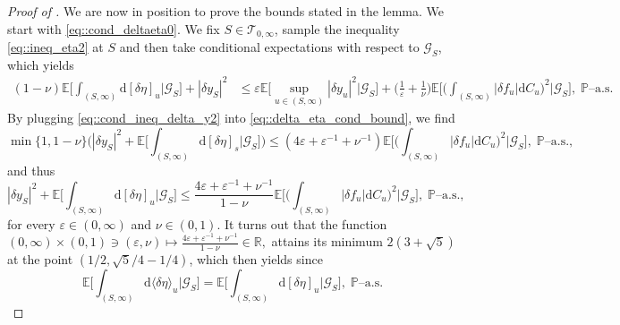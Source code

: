 \documentclass[10pt]{article} %
\newcommand\cG{\mathcal G}
\newcommand\cT{\mathcal T}
\def \E{\mathbb{E}}
\def \P{\mathbb{P}}
\def \R{\mathbb{R}}
\def\d{\mathrm{d}}
\begin{document}
\begin{proof}[Proof of ]
\medskip
We are now in position to prove the bounds stated in the lemma. We start with \eqref{eq::cond_deltaeta0}. We fix $S \in \cT_{0,\infty}$, sample the inequality \eqref{eq::ineq_eta2} at $S$ and then take conditional expectations with respect to $\cG_S$, which yields
\begin{align}\label{eq::delta_eta_cond_bound}
	(1-\nu) \E \bigg[\int_{(S,\infty)} \d [\delta \eta]_u \bigg| \cG_S \bigg] + |\delta y_S|^2 
	&\leq  \varepsilon \E\bigg[ \sup_{u \in (S,\infty)} |\delta y_u|^2 \bigg| \cG_S \bigg] + \bigg(\frac{1}{\varepsilon} + \frac{1}{\nu}\bigg) \E\bigg[ \bigg( \int_{(S,\infty)} |\delta f_u| \d C_u\bigg)^2 \bigg| \cG_S \bigg], \; \text{$\P$--a.s.}
\end{align}
By plugging \eqref{eq::cond_ineq_delta_y2} into \eqref{eq::delta_eta_cond_bound}, we find
\begin{equation*}
	\min\{1,1-\nu\}\bigg(|\delta y_S|^2 + \E \bigg[ \int_{(S,\infty)} \d [\delta \eta]_s \bigg| \cG_S \bigg]\bigg) \leq (4 \varepsilon + {\varepsilon}^{-1} + {\nu}^{-1}) \E\bigg[ \bigg( \int_{(S,\infty)} |\delta f_u| \d C_u\bigg)^2 \bigg| \cG_S \bigg], \; \text{$\P$--a.s.},
\end{equation*}
and thus
\begin{equation*}
	|\delta y_S|^2 + \E \bigg[ \int_{(S,\infty)} \d [\delta \eta]_u \bigg| \cG_S \bigg]\leq \frac{4 \varepsilon + {\varepsilon}^{-1} + {\nu}^{-1}}{1-\nu} \E\bigg[ \bigg( \int_{(S,\infty)} |\delta f_u| \d C_u\bigg)^2 \bigg| \cG_S \bigg], \; \text{$\P$--a.s.},
\end{equation*}
for every $\varepsilon \in (0,\infty)$ and $\nu \in (0,1)$. It turns out that the function $(0,\infty) \times (0,1) \ni (\varepsilon,\nu) \longmapsto \frac{4 \varepsilon +{\varepsilon}^{-1} + {\nu}^{-1}}{1-\nu} \in \R,$ attains its minimum $2(3 + \sqrt{5})$ at the point $(1/2,\sqrt{5}/4-1/4)$, which then yields  since
\begin{equation*}
	\E \bigg[ \int_{(S,\infty)} \d \langle\delta \eta\rangle_u \bigg| \cG_S \bigg] = \E \bigg[ \int_{(S,\infty)} \d [\delta \eta]_u \bigg| \cG_S \bigg], \; \text{$\P$--a.s.}
\end{equation*}


\end{proof}
\end{document}
